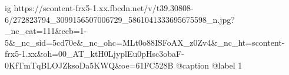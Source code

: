  
 
 
 
 

\ifcmt
  ig https://scontent-frx5-1.xx.fbcdn.net/v/t39.30808-6/272823794_3099156507006729_5861041333695675598_n.jpg?_nc_cat=111&ccb=1-5&_nc_sid=5cd70e&_nc_ohc=MLt0o88ISFoAX_z0Zv4&_nc_ht=scontent-frx5-1.xx&oh=00_AT_ktH0LjyplEu0pHsc3obaF-0KfTmTqBLOJZksoDa5KWQ&oe=61FC528B
  @caption @label 1
\fi
